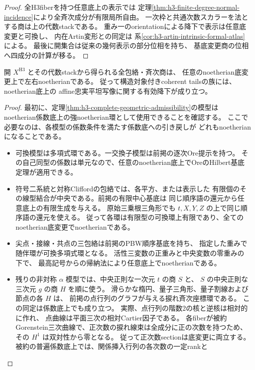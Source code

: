 \begin{proof}
全H3fiberを持つ任意底上の表示では
定理\ref{thm:h3-finite-degree-normal-incidence}により全斉次成分が有限局所自由。
一次枠と共通次数スカラーを法とする商は上の代数stackである。
重み一のorientationによる降下で表示は任意底変更と可換し、
内在Artin変形との同定は
系\ref{cor:h3-artin-intrinsic-formal-atlas}による。
最後に開集合は従来の幾何表示の部分位相を持ち、
基底変更商の位相へ四成分の計算が移る。
\end{proof}

\begin{theorem}\label{thm:h3-presentation-strong-noetherian}
開 $X^{\mathrm{H3}}$ とその代数stackから得られる全包絡・斉次商は、
任意のnoetherian底変更上で左右noetherianである。
従って構造対象付きcoherent tailsの族には、noetherian底上の
affine忠実平坦写像に関する有効降下が成り立つ。
\end{theorem}
\begin{proof}
最初に、定理\ref{thm:h3-complete-geometric-admissibility}の模型は
noetherian係数底上の強noetherian環として使用できることを確認する。
ここで必要なのは、各模型の係数条件を満たす係数底への引き戻しが
どれもnoetherianになることである。
\begin{itemize}
\item 可換模型は多項式環である。一交換子模型は前掲の逐次Ore提示を持つ。
その自己同型の係数は単元なので、任意のnoetherian底上でOreのHilbert基底定理が適用できる。
\item 符号二系統と対称Cliffordの包絡では、各平方、または表示した
有限個のその線型結合が中央である。前掲の有限中心基底は
同じ順序語の還元から任意底上の有限生成を与える。
原始三乗根三角形でも $t,X,Y,Z$ の上で同じ順序語の還元を使える。
従って各環は有限型の可換環上有限であり、全てのnoetherian底変更でnoetherianである。
\item 尖点・接線・共点の三包絡は前掲のPBW順序基底を持ち、
指定した重みで随伴環が可換多項式環となる。
活性三変数の正重みと中央変数の零重みの下で、
最高記号からの帰納法により任意底上でnoetherianである。
\item 残りの非対称 $\alpha$ 模型では、中央正則な一次元 $t$ の商 $S$ と、
$S$ の中央正則な三次元 $g$ の商 $H$ を順に使う。
滑らかな楕円、量子三角形、量子割線および節点の各 $H$ は、
前掲の点行列のグラフが与える捩れ斉次座標環である。
この同定は係数底上でも成り立つ。
実際、点行列の階数2の核と逆核は相対的に作れ、
点曲線は平面三次の相対Cartier因子である。
各fiberが被約Gorenstein三次曲線で、正次数の捩れ線束は全成分に正の次数を持つため、
その $H^1$ は双対性から零となる。
従って正次数sectionは底変更に両立する。
被約の普遍係数底上では、関係挿入行列の各次数の一定rankと

\end{itemize}
\end{proof}
